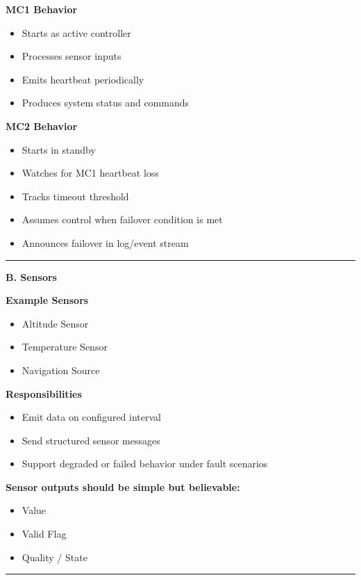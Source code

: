 \documentclass{report}
\begin{document}
\textbf{MC1 Behavior}
\begin{itemize}
   \item Starts as active controller
   \item Processes sensor inputs
   \item Emits heartbeat periodically
   \item Produces system status and commands
\end{itemize}

\textbf{MC2 Behavior}
\begin{itemize}
   \item Starts in standby
   \item Watches for MC1 heartbeat loss
   \item Tracks timeout threshold
   \item Assumes control when failover condition is met 
   \item Announces failover in log/event stream
\end{itemize}

\begin{center}
\rule{0.9\textwidth}{1pt}
\end{center}

\textbf{B. Sensors}

\textbf{Example Sensors} 
\begin{itemize}
   \item Altitude Sensor
   \item Temperature Sensor
   \item Navigation Source
\end{itemize}

\textbf{Responsibilities} 
\begin{itemize}
   \item Emit data on configured interval
   \item Send structured sensor messages
   \item Support degraded or failed behavior under fault scenarios
\end{itemize}

\textbf{Sensor outputs should be simple but believable:} 
\begin{itemize}
   \item Value
   \item Valid Flag
   \item Quality / State
\end{itemize}


\begin{center}
\rule{0.9\textwidth}{1pt}
\end{center}
\end{document}

